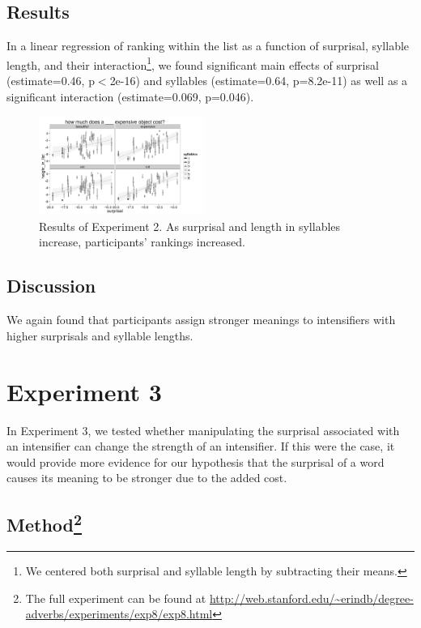 \documentclass[10pt,letterpaper]{article}
\begin{document}
\subsection{Results}

In a linear regression of ranking within the list as a function of surprisal, syllable length, and their interaction\footnote{We centered both surprisal and syllable length by subtracting their means.}, we found significant main effects of surprisal (estimate=0.46, p$<$2e-16) and syllables (estimate=0.64, p=8.2e-11) as well as a significant interaction (estimate=0.069, p=0.046).

\begin{figure}[ht]
\begin{center}
\includegraphics[width=0.48\textwidth]{analysis_files_for_writeup/images/exp2-plot.png}
\end{center}
\caption{Results of Experiment 2. As surprisal and length in syllables increase, participants' rankings increased.} 
\label{exp2-plot}
\end{figure}

\subsection{Discussion}

We again found that participants assign stronger meanings to intensifiers with higher surprisals and syllable lengths.

\section{Experiment 3}

In Experiment 3, we tested whether manipulating the surprisal associated with an intensifier can change the strength of an intensifier. If this were the case, it would provide more evidence for our hypothesis that the surprisal of a word causes its meaning to be stronger due to the added cost.

\subsection{Method\footnote{The full experiment can be found at \url{http://web.stanford.edu/~erindb/degree-adverbs/experiments/exp8/exp8.html}}}
\end{document}
